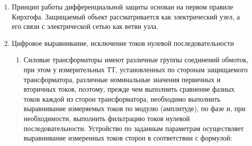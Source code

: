 \begin{enumerate}
\begin{enumerate}
\item
Оперативный вывод ДЗТ из работы происходит при появлении активного сигнала на входе «ОВ ДЗТ», при этом осуществляется вывод защитных функций ДТО и ДТЗт. 
\end{enumerate}
\item
Принцип работы дифференциальной защиты основан на первом правиле Кирхгофа. Защищаемый объект рассматривается как электрический узел, а его связи с электрической сетью как ветви узла.


\item  Цифровое выравнивание, исключение токов нулевой последовательности

\begin{enumerate}

\item
Силовые трансформаторы имеют различные группы соединений обмоток, при этом у измерительных ТТ, установленных по сторонам защищаемого трансформатора, различные номинальные значения первичных и вторичных токов, поэтому, прежде чем выполнить сравнение фазных токов каждой из сторон трансформатора, необходимо выполнить выравнивание измеряемых токов по модулю (амплитуде), по фазе и, при необходимости, выполнить фильтрацию токов нулевой последовательности.
Устройство по заданным параметрам осуществляет выравнивание измеренных токов сторон в соответствии с формулой:


\end{enumerate}
\end{enumerate}
